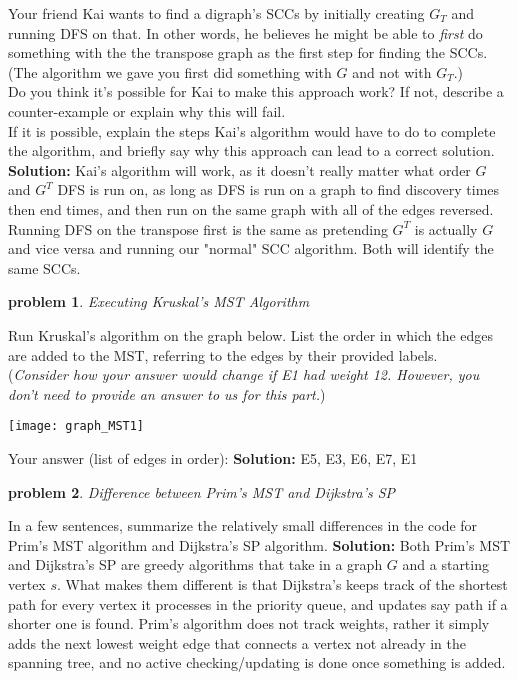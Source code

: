 \documentclass[10pt]{article}
\newcommand{\solution}[1]{\color{blue}\hfill\break\noindent\textbf{Solution:} #1\color{black}}
\newtheorem{problem}{\sc\color{cit}problem}
\begin{document}
Your friend Kai wants to find a digraph's SCCs by initially creating $G_T$ and running DFS on that. In other words, he believes he might be able to \textit{first} do something with the the transpose graph as the first step for finding the SCCs. (The algorithm we gave you first did something with $G$ and not with $G_T$.) \\
Do you think it's possible for Kai to make this approach work? If not, describe a counter-example or explain why this will fail. \\
If it is possible, explain the steps Kai's algorithm would have to do to complete the algorithm, and briefly say why this approach can lead to a correct solution.
\solution{
    Kai's algorithm will work, as it doesn't really matter what order $G$ and $G^T$ DFS is run on, as long as DFS is run on a graph to find discovery times then end times, and then run on the same graph with all of the edges reversed. Running DFS on the transpose first is the same as pretending $G^T$ is actually $G$ and vice versa and running our "normal" SCC algorithm. Both will identify the same SCCs.
}

\newpage 
\begin{problem} Executing Kruskal's MST Algorithm \end{problem}
Run Kruskal's algorithm on the graph below. List the order in which the edges are added to the MST, referring to the edges by their provided labels. \\
(\emph{Consider how your answer would change if E1 had weight 12.  However, you don't need to provide an answer to us for this part.})

\texttt{[image: graph\_MST1]}

Your answer (list of edges in order):
\solution{
    E5, E3, E6, E7, E1
}

\begin{problem} Difference between Prim's MST and Dijkstra's SP \end{problem}
In a few sentences, summarize the relatively small differences in the code for Prim's MST algorithm and Dijkstra's SP algorithm.
\solution{
    Both Prim's MST and Dijkstra's SP are greedy algorithms that take in a graph $G$ and a starting vertex $s$. What makes them different is that Dijkstra's keeps track of the shortest path for every vertex it processes in the priority queue, and updates say path if a shorter one is found. Prim's algorithm does not track weights, rather it simply adds the next lowest weight edge that connects a vertex not already in the spanning tree, and no active checking/updating is done once something is added.
}
\end{document}
